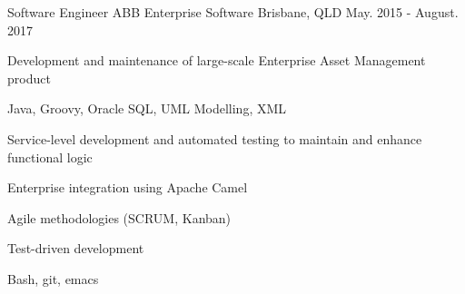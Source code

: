 \begin{cventries}
  \cventry
    {Software Engineer} %
    {ABB Enterprise Software} %
    {Brisbane, QLD} %
    {May. 2015 - August. 2017} %
    {
      \begin{cvitems} %
        \item {Development and maintenance of large-scale Enterprise Asset Management product}
        \item {Java, Groovy, Oracle SQL, UML Modelling, XML}
        \item {Service-level development and automated testing to maintain and enhance functional logic}
        \item {Enterprise integration using Apache Camel}
        \item {Agile methodologies (SCRUM, Kanban)}
        \item {Test-driven development}
        \item {Bash, git, emacs}
      \end{cvitems}
    }

\end{cventries}
